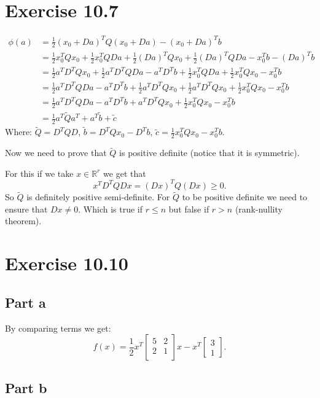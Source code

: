 \documentclass{article}
\begin{document}
\section*{Exercise 10.7}
\begin{align*}
	\phi(a)&=\frac{1}{2}(x_0+Da)^TQ(x_0+Da)-(x_0+Da)^Tb\\
	&=\frac{1}{2}x_0^TQx_0+\frac{1}{2}x_0^TQDa+\frac{1}{2}(Da)^TQx_0+\frac{1}{2}(Da)^TQDa -x_0^Tb-(Da)^Tb\\
	&=\frac{1}{2}a^TD^TQx_0+\frac{1}{2}a^TD^TQDa-a^TD^Tb+\frac{1}{2}x_0^TQDa + \frac{1}{2}x_0^TQx_0-x_0^Tb\\
	&=\frac{1}{2}a^TD^TQDa-a^TD^Tb+\frac{1}{2}a^TD^TQx_0+\frac{1}{2}a^TD^TQx_0 + \frac{1}{2}x_0^TQx_0-x_0^Tb\\
	&=\frac{1}{2}a^TD^TQDa-a^TD^Tb+a^TD^TQx_0+ \frac{1}{2}x_0^TQx_0-x_0^Tb\\
	&=\frac{1}{2}a^T\tilde{Q}a^T+a^T\tilde{b}+\tilde{c}
\end{align*}
Where: $\tilde{Q}=D^TQD$, $\tilde{b}=D^TQx_0-D^Tb$, $\tilde{c}=\frac{1}{2}x_0^TQx_0-x_0^Tb$.

Now we need to prove that $\tilde{Q}$ is positive definite (notice that it is symmetric).

For this if we take $x\in\mathbb{R}^r$ we get that
\[
	x^TD^TQDx=(Dx)^TQ(Dx)\geq 0.
\]
So $\tilde{Q}$ is definitely positive semi-definite. For $\tilde{Q}$ to be
positive definite we need to ensure that $Dx\neq 0$. Which is true if $r\leq n$
but false if $r>n$ (rank-nullity theorem).
\section*{Exercise 10.10}
\subsection*{Part a}
By comparing terms we get:
\[
	f(x)=\frac{1}{2}x^T\begin{bmatrix}
	5 & 2 \\
	2 & 1\\
	\end{bmatrix}x
	- x^T\begin{bmatrix}
	3\\
	1
	\end{bmatrix}.
\]
\subsection*{Part b}
\end{document}
